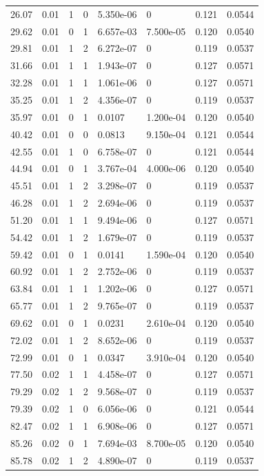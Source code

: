 \documentclass[preview]{standalone}
\begin{document}
{{\begin{tabular}{L{1.2cm}C{1.2cm} C{0.3cm}C{0.5cm} C{1.4cm}C{1.4cm} C{1.4cm}C{1.4cm}}
  26.07  &  0.01  & 1     &  0 &  5.350e-06  & 0  & 0.121 &  0.0544   \\ 
  29.62  &  0.01  & 0     &  1 &  6.657e-03  & 7.500e-05  & 0.120 &  0.0540   \\ 
  29.81  &  0.01  & 1     &  2 &  6.272e-07  & 0  & 0.119 &  0.0537   \\ 
  31.66  &  0.01  & 1     &  1 &  1.943e-07  & 0  & 0.127 &  0.0571   \\ 
  32.28  &  0.01  & 1     &  1 &  1.061e-06  & 0  & 0.127 &  0.0571   \\ 
  35.25  &  0.01  & 1     &  2 &  4.356e-07  & 0  & 0.119 &  0.0537   \\ 
  35.97  &  0.01  & 0     &  1 &  0.0107  & 1.200e-04  & 0.120 &  0.0540   \\ 
  40.42  &  0.01  & 0     &  0 &  0.0813  & 9.150e-04  & 0.121 &  0.0544   \\ 
  42.55  &  0.01  & 1     &  0 &  6.758e-07  & 0  & 0.121 &  0.0544   \\ 
  44.94  &  0.01  & 0     &  1 &  3.767e-04  & 4.000e-06  & 0.120 &  0.0540   \\ 
  45.51  &  0.01  & 1     &  2 &  3.298e-07  & 0  & 0.119 &  0.0537   \\ 
  46.28  &  0.01  & 1     &  2 &  2.694e-06  & 0  & 0.119 &  0.0537   \\ 
  51.20  &  0.01  & 1     &  1 &  9.494e-06  & 0  & 0.127 &  0.0571   \\ 
  54.42  &  0.01  & 1     &  2 &  1.679e-07  & 0  & 0.119 &  0.0537   \\ 
  59.42  &  0.01  & 0     &  1 &  0.0141  & 1.590e-04  & 0.120 &  0.0540   \\ 
  60.92  &  0.01  & 1     &  2 &  2.752e-06  & 0  & 0.119 &  0.0537   \\ 
  63.84  &  0.01  & 1     &  1 &  1.202e-06  & 0  & 0.127 &  0.0571   \\ 
  65.77  &  0.01  & 1     &  2 &  9.765e-07  & 0  & 0.119 &  0.0537   \\ 
  69.62  &  0.01  & 0     &  1 &  0.0231  & 2.610e-04  & 0.120 &  0.0540   \\ 
  72.02  &  0.01  & 1     &  2 &  8.652e-06  & 0  & 0.119 &  0.0537   \\ 
  72.99  &  0.01  & 0     &  1 &  0.0347  & 3.910e-04  & 0.120 &  0.0540   \\ 
  77.50  &  0.02  & 1     &  1 &  4.458e-07  & 0  & 0.127 &  0.0571   \\ 
  79.29  &  0.02  & 1     &  2 &  9.568e-07  & 0  & 0.119 &  0.0537   \\ 
  79.39  &  0.02  & 1     &  0 &  6.056e-06  & 0  & 0.121 &  0.0544   \\ 
  82.47  &  0.02  & 1     &  1 &  6.908e-06  & 0  & 0.127 &  0.0571   \\ 
  85.26  &  0.02  & 0     &  1 &  7.694e-03  & 8.700e-05  & 0.120 &  0.0540   \\ 
  85.78  &  0.02  & 1     &  2 &  4.890e-07  & 0  & 0.119 &  0.0537   \\ 
\hline 
\end{tabular} 

}}
\end{document}
